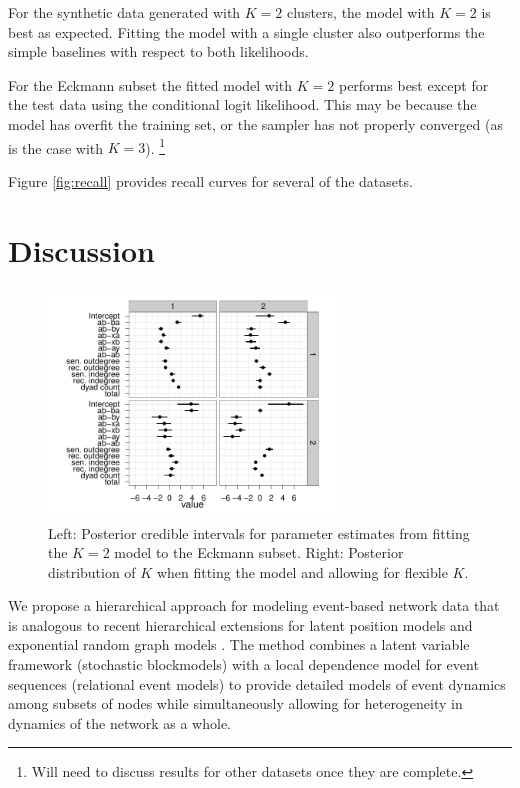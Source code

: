 \documentclass[11pt]{article}
\begin{document}
For the synthetic data generated with $K=2$ clusters, the model with $K=2$ is best as expected.  Fitting the model with a single cluster also outperforms the simple baselines with respect to both likelihoods.  

For the Eckmann subset the fitted model with $K=2$ performs best except for the test data using the conditional logit likelihood.  This may be because the model has overfit the training set, or the sampler has not properly converged (as is the case with $K=3$).  \footnote{Will need to discuss results for other datasets once they are complete.}


Figure \ref{fig:recall} provides recall curves for several of the datasets.

\section{Discussion}

\begin{figure}[ht]
\includegraphics[width=3in]{../figs/eckmann-small/params-estimates}
\caption{Left: Posterior credible intervals for parameter estimates from fitting the $K=2$ model to the Eckmann subset.  Right: Posterior distribution of $K$ when fitting the model and allowing for flexible $K$.}
\label{fig:posteriorparams}
\end{figure}

 We propose a hierarchical approach for modeling event-based network data that is analogous to recent hierarchical extensions for latent position models \cite{Handcock2007} and exponential random graph models \cite{Schweinberger2011}.  The method combines a latent variable framework (stochastic blockmodels) with a local dependence model for event sequences (relational event models) to provide detailed models of event dynamics among subsets of nodes while simultaneously allowing for heterogeneity in dynamics of the network as a whole.
\end{document}
